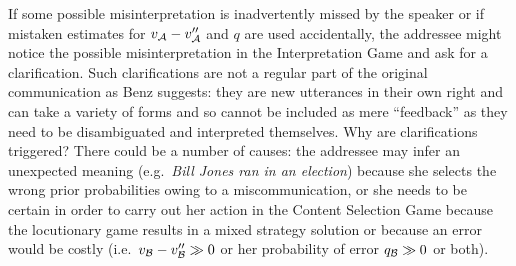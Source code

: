 
If some possible misinterpretation is inadvertently missed by the speaker or if mistaken estimates for $v_{\cal A} - v''_{\cal A}$ and $q$ are used accidentally, the addressee might notice the possible misinterpretation in the Interpretation Game and ask for a clarification. Such clarifications are not a regular part of the original communication as Benz suggests: they are new utterances in their own right and can take a variety of forms and so cannot be included as mere ``feedback'' as they need to be disambiguated and interpreted themselves. Why are clarifications triggered? There could be a number of causes: the addressee may infer an unexpected meaning (e.g.\ \emph{Bill Jones ran in an election}) because she selects the wrong prior probabilities owing to a miscommunication, or she needs to be certain in order to carry out her action in the Content Selection Game because the locutionary game results in a mixed strategy solution or because an error would be costly (i.e.\ $v_{\cal B} - v''_{\cal B} \gg 0$ or her probability of error $q_{\cal B} \gg 0$ or both).\largerpage

